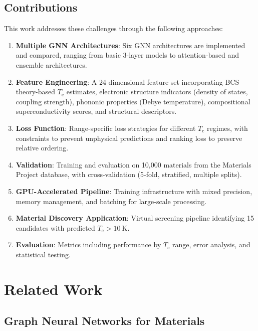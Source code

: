 \documentclass[11pt,a4paper]{article}
\begin{document}
\subsection{Contributions}

This work addresses these challenges through the following approaches:

\begin{enumerate}
    \item \textbf{Multiple GNN Architectures}: Six GNN architectures are implemented and compared, ranging from basic 3-layer models to attention-based and ensemble architectures.
    
    \item \textbf{Feature Engineering}: A 24-dimensional feature set incorporating BCS theory-based $T_{\text{c}}$ estimates, electronic structure indicators (density of states, coupling strength), phononic properties (Debye temperature), compositional superconductivity scores, and structural descriptors.
    
    \item \textbf{Loss Function}: Range-specific loss strategies for different $T_{\text{c}}$ regimes, with constraints to prevent unphysical predictions and ranking loss to preserve relative ordering.
    
    \item \textbf{Validation}: Training and evaluation on 10,000 materials from the Materials Project database, with cross-validation (5-fold, stratified, multiple splits).
    
    \item \textbf{GPU-Accelerated Pipeline}: Training infrastructure with mixed precision, memory management, and batching for large-scale processing.
    
    \item \textbf{Material Discovery Application}: Virtual screening pipeline identifying 15 candidates with predicted $T_{\text{c}} > \SI{10}{\kelvin}$.
    
    \item \textbf{Evaluation}: Metrics including performance by $T_{\text{c}}$ range, error analysis, and statistical testing.
\end{enumerate}

\section{Related Work}

\subsection{Graph Neural Networks for Materials}
\end{document}
